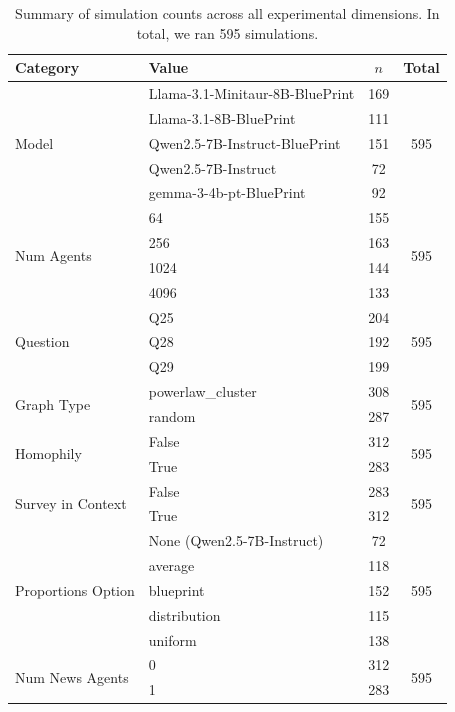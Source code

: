 \documentclass{article} %
\begin{document}
\begin{table}[h]
\centering
\begin{tabular}{llcc}
\toprule
Category & Value & $n$ & Total \\
\midrule
\multirow{5}{*}{Model}
 & Llama-3.1-Minitaur-8B-BluePrint & 169 & \multirow{5}{*}{595} \\
 & Llama-3.1-8B-BluePrint & 111 & \\
 & Qwen2.5-7B-Instruct-BluePrint & 151 & \\
 & Qwen2.5-7B-Instruct & 72 & \\
 &  gemma-3-4b-pt-BluePrint & 92 & \\
\midrule
\multirow{4}{*}{Num Agents}
 & 64 & 155 & \multirow{4}{*}{595} \\
 & 256 & 163 & \\
 & 1024 & 144 & \\
 & 4096 & 133 & \\
\midrule
\multirow{3}{*}{Question}
 & Q25 & 204 & \multirow{3}{*}{595} \\
 & Q28 & 192 & \\
 & Q29 & 199 & \\
\midrule
\multirow{2}{*}{Graph Type}
 & powerlaw\_cluster & 308 & \multirow{2}{*}{595} \\
 & random & 287 & \\
\midrule
\multirow{2}{*}{Homophily}
 & False & 312 & \multirow{2}{*}{595} \\
 & True & 283 & \\
\midrule
\multirow{2}{*}{Survey in Context}
 & False & 283 & \multirow{2}{*}{595} \\
 & True & 312 & \\
\midrule
\multirow{5}{*}{Proportions Option}
 & None (Qwen2.5-7B-Instruct) & 72 & \multirow{5}{*}{595} \\
 & average & 118 & \\
 & blueprint & 152 & \\
 & distribution & 115 & \\
 & uniform & 138 & \\
\midrule
\multirow{2}{*}{Num News Agents}
 & 0 & 312 & \multirow{2}{*}{595} \\
 & 1 & 283 & \\
\bottomrule
\end{tabular}
\caption{Summary of simulation counts across all experimental dimensions. In total, we ran 595 simulations.}
\label{tab:all_counts_total}
\end{table}
\end{document}
